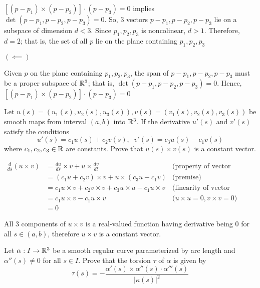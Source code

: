 \documentclass{article}
\begin{document}
$[(p - p_1) \times (p - p_2)] \cdot (p - p_3) = 0$ implies $\det (p - p_1, p - p_2, p - p_3) = 0$. So, $3$ vectors $p - p_1, p - p_2, p - p_3$ lie on a subspace of dimension $d < 3$. Since $p_1, p_2, p_3$ is noncolinear, $d > 1$. Therefore, $d = 2$; that is, the set of all $p$ lie on the plane containing $p_1, p_2, p_3$

$(\impliedby)$

Given $p$ on the plane containing $p_1, p_2, p_3$, the span of $p - p_1, p - p_2, p - p_3$ must be a proper subspace of $\mathbb{R}^3$; that is, $\det (p - p_1, p - p_2, p - p_3) = 0$. Hence, $[(p - p_1) \times (p - p_2)] \cdot (p - p_3) = 0$


\begin{problem}
    Let $u(s) = (u_1(s), u_2(s), u_3(s)), v(s) = (v_1(s), v_2(s), v_3(s))$ be smooth maps from interval $(a, b)$ into $\mathbb{R}^3$. If the derivative $u'(s)$ and $v'(s)$ satisfy the conditions
    $$
        u'(s) = c_1 u(s) + c_2 v(s), \;\; v'(s) = c_3 u(s) - c_1 v(s)
    $$
    where $c_1, c_2, c_3 \in \mathbb{R}$ are constants. Prove that $u(s) \times v(s)$ is a constant vector.
\end{problem}

\begin{align*}
    \frac{d}{ds} (u \times v)
        &= \frac{du}{ds} \times v + u \times \frac{dv}{dt} &\text{(property of vector product derivative)}\\
        &= (c_1 u + c_2 v) \times v + u \times (c_3 u - c_1 v) &\text{(premise)}\\
        &= c_1 u \times v + c_2 v \times v + c_3 u \times u - c_1 u \times v &\text{(linearity of vector product)}\\
        &= c_1 u \times v - c_1 u \times v &\text{($u \times u = 0, v \times v = 0$)}\\
        &= 0
\end{align*}

All $3$ components of $u \times v$ is a real-valued function having derivative being $0$ for all $s \in (a, b)$, therefore $u \times v$ is a constant vector.

\begin{problem}
    Let $\alpha: I \to \mathbb{R}^3$ be a smooth regular curve parameterized by arc length and $\alpha''(s) \neq 0$ for all $s \in I$. Prove that the torsion $\tau$ of $\alpha$ is given by
    $$
        \tau(s) = - \frac{\alpha'(s) \times \alpha''(s) \cdot \alpha'''(s)}{|\kappa(s)|^2}
    $$
\end{problem}
\end{document}
